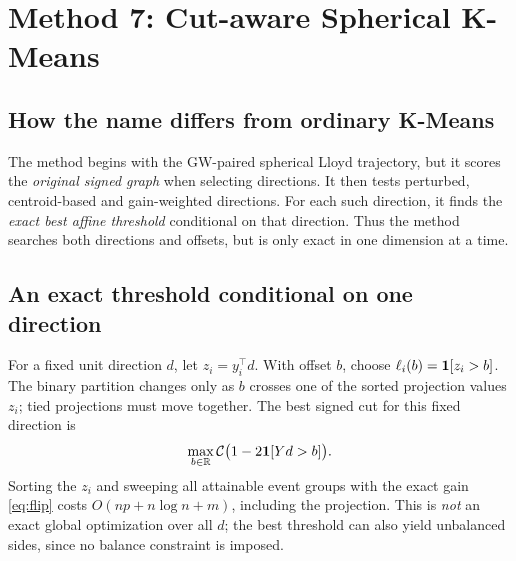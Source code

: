 \section{Method 7: Cut-aware Spherical K-Means}\label{sec:cutaware}
\subsection{How the name differs from ordinary K-Means}
The method  begins with the GW-paired spherical Lloyd trajectory, but it scores the \emph{original signed graph} when selecting directions. It then tests perturbed, centroid-based and gain-weighted directions. For each such direction, it finds the \emph{exact best affine threshold} conditional on that direction. Thus the method searches both directions and offsets, but is only exact in one dimension at a time.

\subsection{An exact threshold conditional on one direction}
For a fixed unit direction $d$, let $z_i=y_i^\top d$. With offset $b$, choose $\ell_i(b)=\mathbf{1}[z_i>b]$. The binary partition changes only as $b$ crosses one of the sorted projection values $z_i$; tied projections must move together. The best signed cut for this fixed direction is
\begin{equation}\label{eq:threshold}
\max_{b\in\mathbb{R}}\mathcal{C}\bigl(1-2\mathbf{1}[Yd>b]\bigr).
\end{equation}
Sorting the $z_i$ and sweeping all attainable event groups with the exact gain \eqref{eq:flip} costs $O(np+n\log n+m)$, including the projection. This is \emph{not} an exact global optimization over all $d$; the best threshold can also yield unbalanced sides, since no balance constraint is imposed.

